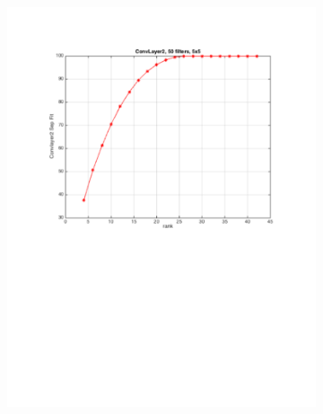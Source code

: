 \documentclass{article} %
\begin{document}
\begin{figure}[h]
  \centering
  \begin{subfigure}[b]{0.40\textwidth}
   \includegraphics[width=\textwidth]{images/imagesCNN_page2.pdf}
    \caption{}
  \end{subfigure}
  \begin{subfigure}[b]{0.40\textwidth}

\end{subfigure}
\end{figure}
\end{document}

